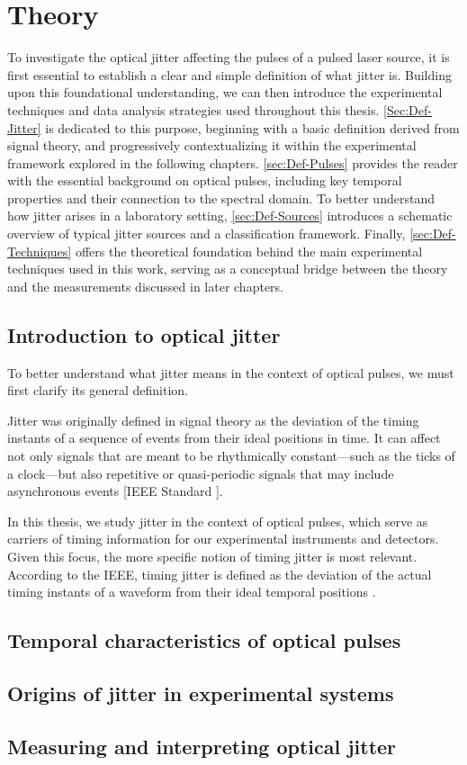 \chapter{Theory}
To investigate the optical jitter affecting the pulses of a pulsed laser source, it is first essential to establish a clear and simple definition of what jitter is. Building upon this foundational understanding, we can then introduce the experimental techniques and data analysis strategies used throughout this thesis.
\autoref{Sec:Def-Jitter} is dedicated to this purpose, beginning with a basic definition derived from signal theory, and progressively contextualizing it within the experimental framework explored in the following chapters.
\autoref{sec:Def-Pulses} provides the reader with the essential background on optical pulses, including key temporal properties and their connection to the spectral domain.
To better understand how jitter arises in a laboratory setting, \autoref{sec:Def-Sources} introduces a schematic overview of typical jitter sources and a classification framework.
Finally, \autoref{sec:Def-Techniques} offers the theoretical foundation behind the main experimental techniques used in this work, serving as a conceptual bridge between the theory and the measurements discussed in later chapters.
\section{Introduction to optical jitter}
\label{Sec:Def-Jitter}

To better understand what jitter means in the context of optical pulses, we must first clarify its general definition.

Jitter was originally defined in signal theory as the deviation of the timing instants of a sequence of events from their ideal positions in time. It can affect not only signals that are meant to be rhythmically constant—such as the ticks of a clock—but also repetitive or quasi-periodic signals that may include asynchronous events [IEEE Standard \cite{General_IEEE}].

In this thesis, we study jitter in the context of optical pulses, which serve as carriers of timing information for our experimental instruments and detectors. Given this focus, the more specific notion of timing jitter is most relevant.
According to the IEEE, timing jitter is defined as the deviation of the actual timing instants of a waveform from their ideal temporal positions \cite{General_IEEE}.


\section{Temporal characteristics of optical pulses}

\label{sec:Def-Pulses}
\section{Origins of jitter in experimental systems}
\label{sec:Def-Sources}
\section{Measuring and interpreting optical jitter}
\label{sec:Def-Techniques}